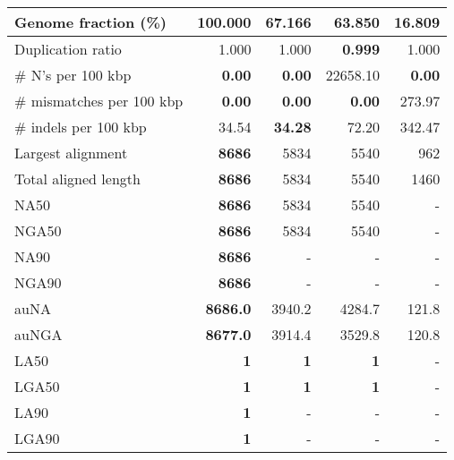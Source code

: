 \documentclass[12pt,a4paper]{article}
\begin{document}
\begin{table}[ht]
\begin{center}
\begin{tabular}{|l*{4}{|r}|}
Genome fraction (\%) & {\bf 100.000} & 67.166 & 63.850 & 16.809 \\ \hline
Duplication ratio & 1.000 & 1.000 & {\bf 0.999} & 1.000 \\ \hline
\# N's per 100 kbp & {\bf 0.00} & {\bf 0.00} & 22658.10 & {\bf 0.00} \\ \hline
\# mismatches per 100 kbp & {\bf 0.00} & {\bf 0.00} & {\bf 0.00} & 273.97 \\ \hline
\# indels per 100 kbp & 34.54 & {\bf 34.28} & 72.20 & 342.47 \\ \hline
Largest alignment & {\bf 8686} & 5834 & 5540 & 962 \\ \hline
Total aligned length & {\bf 8686} & 5834 & 5540 & 1460 \\ \hline
NA50 & {\bf 8686} & 5834 & 5540 & - \\ \hline
NGA50 & {\bf 8686} & 5834 & 5540 & - \\ \hline
NA90 & {\bf 8686} & - & - & - \\ \hline
NGA90 & {\bf 8686} & - & - & - \\ \hline
auNA & {\bf 8686.0} & 3940.2 & 4284.7 & 121.8 \\ \hline
auNGA & {\bf 8677.0} & 3914.4 & 3529.8 & 120.8 \\ \hline
LA50 & {\bf 1} & {\bf 1} & {\bf 1} & - \\ \hline
LGA50 & {\bf 1} & {\bf 1} & {\bf 1} & - \\ \hline
LA90 & {\bf 1} & - & - & - \\ \hline
LGA90 & {\bf 1} & - & - & - \\ \hline
\end{tabular}
\end{center}
\end{table}
\end{document}
